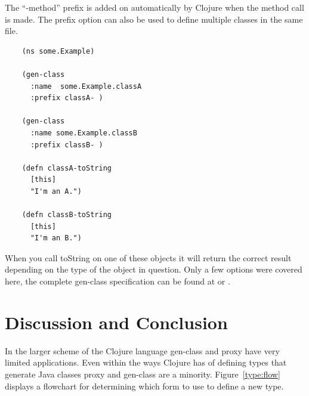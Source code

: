 \documentclass[12pt]{article}
\begin{document}
	The ``-method'' prefix is added on automatically by Clojure when the method call is made. The prefix option can also be used to define multiple classes in the same file.
	
	\begin{verbatim}
	(ns some.Example)
	
	(gen-class
	  :name  some.Example.classA
	  :prefix classA- )
	  
	(gen-class
	  :name some.Example.classB
	  :prefix classB- )
	  
	(defn classA-toString
	  [this]
	  "I'm an A.")
	  
	(defn classB-toString
	  [this]
	  "I'm an B.")
	\end{verbatim}
	
	When you call toString on one of these objects it will return the correct result depending on the type of the object in question. Only a few options were covered here, the complete gen-class specification can be found at \cite{docs:genClass} or \cite{api:genClass}. 

		
\section{Discussion and Conclusion}\label{sec:sugg}
	In the larger scheme of the Clojure language gen-class and proxy have very limited applications. Even within the ways Clojure has of defining types that generate Java classes proxy and gen-class are a minority. Figure~\ref{type:flow} displays a  flowchart for determining which form to use to define a new type.
	
\end{document}
